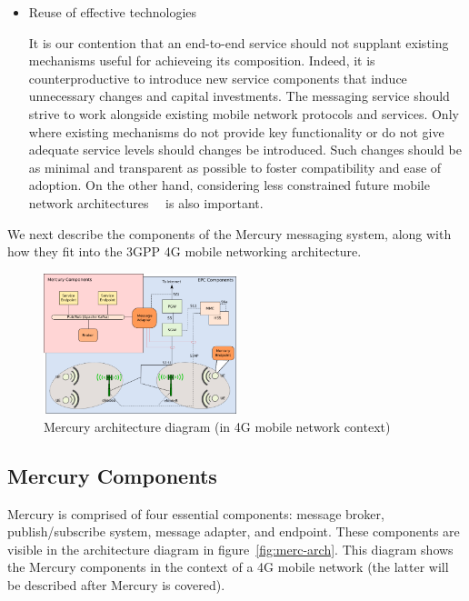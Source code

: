 \begin{itemize}
\item Reuse of effective technologies

It is our contention that an end-to-end service should not supplant
existing mechanisms useful for achieveing its composition.  Indeed, it
is counterproductive to introduce new service components that induce
unnecessary changes and capital investments. The messaging service
should strive to work alongside existing mobile network protocols and
services.  Only where existing mechanisms do not provide key
functionality or do not give adequate service levels should changes be
introduced.  Such changes should be as minimal and transparent as
possible to foster compatibility and ease of adoption. On the other
hand, considering less constrained future mobile network
architectures~\cite{5G}~\cite{venkataramani2014mobility} is also important.

\end{itemize}

We next describe the components of the Mercury messaging system, along
with how they fit into the 3GPP 4G mobile networking architecture.

\begin{figure}[h]
  \begin{center}
    \includegraphics[width=0.5\textwidth]{figs/mercury-arch.png}
    \caption{Mercury architecture diagram (in 4G mobile network context)}
    \label{fig:arch}
  \end{center}
\end{figure}

\subsection{Mercury Components}

Mercury is comprised of four essential components: message broker,
publish/subscribe system, message adapter, and endpoint.  These
components are visible in the architecture diagram in
figure~\ref{fig:merc-arch}. This diagram shows the Mercury components
in the context of a 4G mobile network (the latter will be described
after Mercury is covered).

